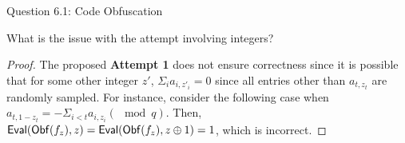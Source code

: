 \begin{solution}{Question 6.1: Code Obfuscation}\label{ques:61}
    \begin{question}
        What is the issue with the attempt involving integers?
    \end{question}
    \tcblower{}
    \begin{proof}
        The proposed \textbf{Attempt 1} does not ensure correctness since it is possible that for some other integer $z'$, $\Sigma_i a_{i,z'_i} = 0$ since all entries other than $a_{t,z_t}$ are randomly sampled. For instance, consider the following case when $a_{t,1-z_t} = -\Sigma_{i<t}a_{i,z_i}(\mod q)$. Then, $\mathsf{Eval}(\mathsf{Obf}(f_z), z) = \mathsf{Eval}(\mathsf{Obf}(f_z), z\oplus 1) = 1$, which is incorrect.
    \end{proof}
\end{solution}
